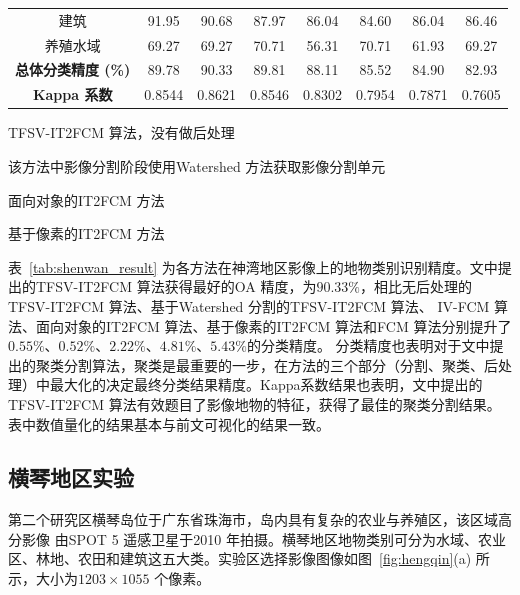 \begin{table}[htbp]
{\begin{threeparttable}[b]
\begin{tabular}{cccccccc}
                建筑                       & 91.95                & 90.68             & 87.97                & 86.04  & 84.60           & 86.04           & 86.46  \\
                养殖水域                   & 69.27                & 69.27             & 70.71                & 56.31  & 70.71           & 61.93           & 69.27  \\
                \cline{1-8}
                \textbf{总体分类精度 (\%)} & 89.78                & 90.33             & 89.81                & 88.11  & 85.52           & 84.90           & 82.93  \\
                \textbf{Kappa 系数}        & 0.8544               & 0.8621            & 0.8546               & 0.8302 & 0.7954          & 0.7871          & 0.7605 \\
                \bottomrule
            \end{tabular}
            \begin{tablenotes}
                \item[1] {TFSV-IT2FCM 算法，没有做后处理}
                \item[2]{该方法中影像分割阶段使用Watershed 方法获取影像分割单元}
                \item[3]{面向对象的IT2FCM 方法}
                \item[4]{基于像素的IT2FCM 方法}
            \end{tablenotes}

        \end{threeparttable}
    }
\end{table}

表~\ref{tab:shenwan_result} 为各方法在神湾地区影像上的地物类别识别精度。文中提出的TFSV-IT2FCM 算法获得最好的OA 精度，为$90.33\%$，相比无后处理的TFSV-IT2FCM 算法、基于Watershed 分割的TFSV-IT2FCM 算法、 IV-FCM 算法、面向对象的IT2FCM 算法、基于像素的IT2FCM 算法和FCM 算法分别提升了$0.55\%$、$0.52\%$、$2.22\%$、$4.81\%$、$5.43\%$的分类精度。
分类精度也表明对于文中提出的聚类分割算法，聚类是最重要的一步，在方法的三个部分（分割、聚类、后处理）中最大化的决定最终分类结果精度。Kappa系数结果也表明，文中提出的TFSV-IT2FCM 算法有效题目了影像地物的特征，获得了最佳的聚类分割结果。表中数值量化的结果基本与前文可视化的结果一致。


\subsection{横琴地区实验}
\label{subsec::chap03-4-1}
第二个研究区横琴岛位于广东省珠海市，岛内具有复杂的农业与养殖区，该区域高分影像
由SPOT 5 遥感卫星于2010 年拍摄。横琴地区地物类别可分为水域、农业区、林地、农田和建筑这五大类。实验区选择影像图像如图~\ref{fig:hengqin}(a) 所示，大小为$1203 \times 1055$ 个像素。


